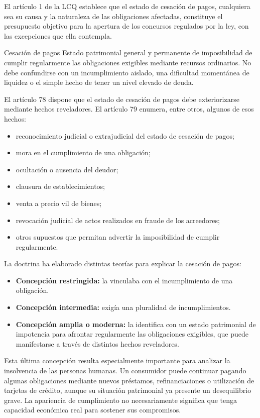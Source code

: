 \documentclass[12pt,oneside]{book}
\begin{document}
El artículo 1 de la LCQ establece que el estado de cesación de pagos, cualquiera sea su causa y la naturaleza de las obligaciones afectadas, constituye el presupuesto objetivo para la apertura de los concursos regulados por la ley, con las excepciones que ella contempla.

\begin{definition}{Cesación de pagos}
Estado patrimonial general y permanente de imposibilidad de cumplir regularmente las obligaciones exigibles mediante recursos ordinarios. No debe confundirse con un incumplimiento aislado, una dificultad momentánea de liquidez o el simple hecho de tener un nivel elevado de deuda.
\end{definition}

El artículo 78 dispone que el estado de cesación de pagos debe exteriorizarse mediante hechos reveladores. El artículo 79 enumera, entre otros, algunos de esos hechos:
\begin{itemize}
    \item reconocimiento judicial o extrajudicial del estado de cesación de pagos;
    \item mora en el cumplimiento de una obligación;
    \item ocultación o ausencia del deudor;
    \item clausura de establecimientos;
    \item venta a precio vil de bienes;
    \item revocación judicial de actos realizados en fraude de los acreedores;
    \item otros supuestos que permitan advertir la imposibilidad de cumplir regularmente.
\end{itemize}

La doctrina ha elaborado distintas teorías para explicar la cesación de pagos:
\begin{itemize}
    \item \textbf{Concepción restringida:} la vinculaba con el incumplimiento de una obligación.
    \item \textbf{Concepción intermedia:} exigía una pluralidad de incumplimientos.
    \item \textbf{Concepción amplia o moderna:} la identifica con un estado patrimonial de impotencia para afrontar regularmente las obligaciones exigibles, que puede manifestarse a través de distintos hechos reveladores.
\end{itemize}

Esta última concepción resulta especialmente importante para analizar la insolvencia de las personas humanas. Un consumidor puede continuar pagando algunas obligaciones mediante nuevos préstamos, refinanciaciones o utilización de tarjetas de crédito, aunque su situación patrimonial ya presente un desequilibrio grave. La apariencia de cumplimiento no necesariamente significa que tenga capacidad económica real para sostener sus compromisos.
\end{document}
